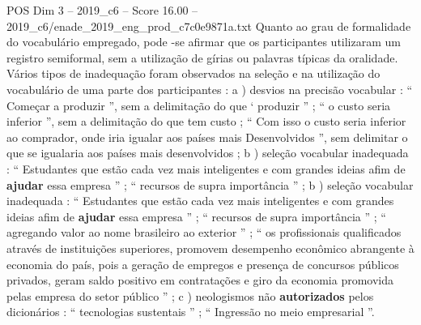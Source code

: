 \begin{textsample}{POS Dim 3 – 2019\_c6 – Score 16.00 – 2019\_c6/enade\_2019\_eng\_prod\_c7c0e9871a.txt}
Quanto ao grau de formalidade do vocabulário empregado, pode -se afirmar que os participantes utilizaram um registro semiformal, sem a utilização de gírias ou palavras típicas da oralidade.
Vários tipos de inadequação foram observados na seleção e na utilização do vocabulário de uma parte dos participantes : a ) desvios na precisão vocabular : “ Começar a produzir ”, sem a delimitação do que ‘ produzir ” ; “ o custo seria inferior ”, sem a delimitação do que tem custo ; “ Com isso o custo seria inferior ao comprador, onde iria igualar aos países mais Desenvolvidos ”, sem delimitar o que se igualaria aos países mais desenvolvidos ; b ) seleção vocabular inadequada : “ Estudantes que estão cada vez mais inteligentes e com grandes ideias afim de \textbf{ajudar} essa empresa ” ; “ recursos de supra importância ” ; b ) seleção vocabular inadequada : “ Estudantes que estão cada vez mais inteligentes e com grandes ideias afim de \textbf{ajudar} essa empresa ” ; “ recursos de supra importância ” ; “ agregando valor ao nome brasileiro ao exterior ” ; “ os profissionais qualificados através de instituições superiores, promovem desempenho econômico abrangente à economia do país, pois a geração de empregos e presença de concursos públicos privados, geram saldo positivo em contratações e giro da economia promovida pelas empresa do setor público ” ; c ) neologismos não \textbf{autorizados} pelos dicionários : “ tecnologias sustentais ” ; “ Ingressão no meio empresarial ”.

\end{textsample}
